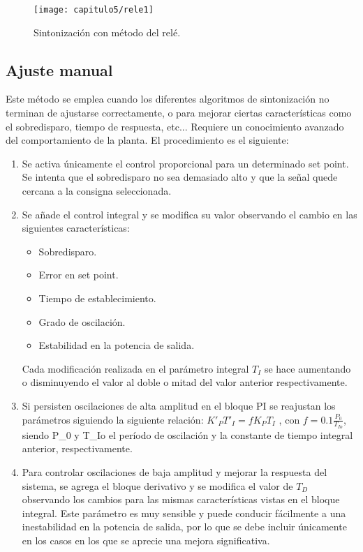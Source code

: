 \smallskip
\begin{figure}[H]%
\noindent \begin{centering}
\texttt{[image: capitulo5/rele1]}
\par\end{centering}
\caption{\label{fig:rele1} Sintonización con método del relé\cite{Wilson}.}
\end{figure}
\smallskip


\subsection{Ajuste manual}
Este método se emplea cuando los diferentes algoritmos de sintonización no terminan de
ajustarse correctamente, o para mejorar ciertas características como el sobredisparo, tiempo
de respuesta, etc... Requiere un conocimiento avanzado del comportamiento de la planta. El
procedimiento es el siguiente:


\begin{enumerate}
\item Se activa únicamente el control proporcional para un determinado set point. Se intenta
que el sobredisparo no sea demasiado alto y que la señal quede cercana a la consigna
seleccionada.
\item Se añade el control integral y se modifica su valor observando el cambio en las siguientes
características:

\begin{itemize}
\item Sobredisparo.
\item Error en set point.
\item Tiempo de establecimiento.
\item Grado de oscilación.
\item Estabilidad en la potencia de salida.
\end{itemize}

Cada modificación realizada en el parámetro integral $T_{I}$ se hace aumentando o disminuyendo
el valor al doble o mitad del valor anterior respectivamente.

\item Si persisten oscilaciones de alta amplitud en el bloque PI se reajustan los parámetros
siguiendo la siguiente relación: $K'_{P}T'_{I}=fK_{P}T_{I}$ , con $f=0.1\frac{P_{0}}{T_{Io}}$, siendo P_{0} y T_{Io} el período de oscilación y la constante de tiempo integral anterior, respectivamente.
\item Para controlar oscilaciones de baja amplitud y mejorar la respuesta del sistema, se
agrega el bloque derivativo y se modifica el valor de $T_{D}$ observando los cambios para
las mismas características vistas en el bloque integral. Este parámetro es muy sensible
y puede conducir fácilmente a una inestabilidad en la potencia de salida, por lo que se
debe incluir únicamente en los casos en los que se aprecie una mejora significativa.
\end{enumerate}

